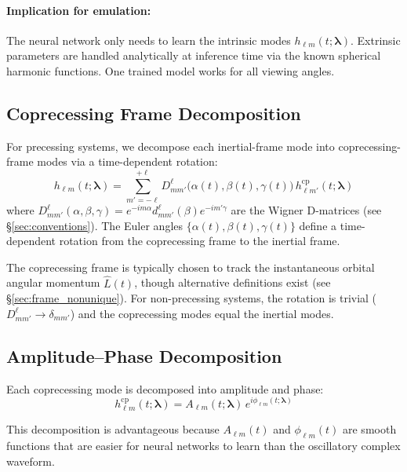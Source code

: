 \documentclass[11pt,a4paper]{article}
\newcommand{\hlm}{h_{\ell m}}
\newcommand{\hcp}{h^{\mathrm{cp}}_{\ell m}}
\newcommand{\Alm}{A_{\ell m}}
\newcommand{\philm}{\phi_{\ell m}}
\newcommand{\veclambda}{\bm{\lambda}}
\begin{document}
\paragraph{Implication for emulation:} The neural network only needs to learn the intrinsic modes $\hlm(t; \veclambda)$. Extrinsic parameters are handled analytically at inference time via the known spherical harmonic functions. One trained model works for all viewing angles.

\subsection{Coprecessing Frame Decomposition}

For precessing systems, we decompose each inertial-frame mode into coprecessing-frame modes via a time-dependent rotation:
\begin{equation}
    \boxed{
    h_{\ell m}(t; \veclambda) = \sum_{m'=-\ell}^{+\ell} D^\ell_{m m'}\bigl(\alpha(t), \beta(t), \gamma(t)\bigr) \, h^{\mathrm{cp}}_{\ell m'}(t; \veclambda)
    }
    \label{eq:coprecessing}
\end{equation}
where $D^\ell_{m m'}(\alpha, \beta, \gamma) = e^{-i m \alpha} d^\ell_{m m'}(\beta) e^{-i m' \gamma}$ are the Wigner D-matrices (see \S\ref{sec:conventions}). The Euler angles $\{\alpha(t), \beta(t), \gamma(t)\}$ define a time-dependent rotation from the coprecessing frame to the inertial frame.

The coprecessing frame is typically chosen to track the instantaneous orbital angular momentum $\hat{L}(t)$, though alternative definitions exist (see \S\ref{sec:frame_nonunique}). For non-precessing systems, the rotation is trivial ($D^\ell_{m m'} \to \delta_{m m'}$) and the coprecessing modes equal the inertial modes.

\subsection{Amplitude--Phase Decomposition}

Each coprecessing mode is decomposed into amplitude and phase:
\begin{equation}
    \boxed{
    \hcp(t; \veclambda) = \Alm(t; \veclambda) \, e^{i\philm(t; \veclambda)}
    }
    \label{eq:amp_phase}
\end{equation}

This decomposition is advantageous because $\Alm(t)$ and $\philm(t)$ are smooth functions that are easier for neural networks to learn than the oscillatory complex waveform.
\end{document}
